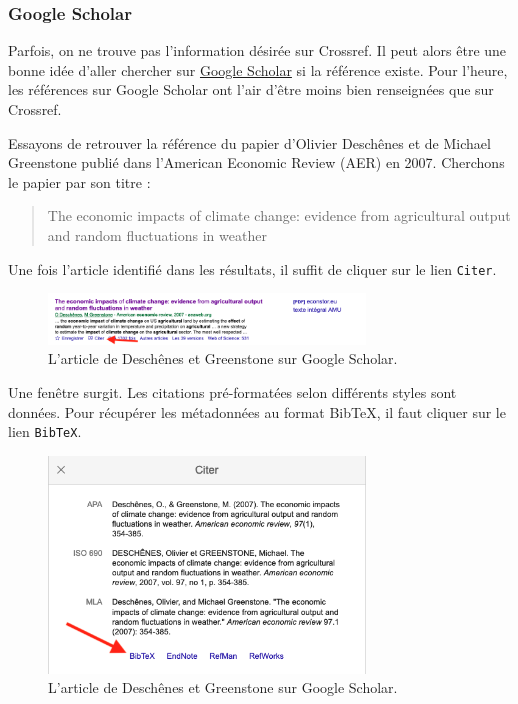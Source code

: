 \documentclass[
  11pt,
]{book}
\numberwithin{equation}{section}
\numberwithin{countremarque}{section}
\begin{document}
\hypertarget{google-scholar}{%
\subsubsection{Google Scholar}\label{google-scholar}}

Parfois, on ne trouve pas l'information désirée sur Crossref. Il peut alors être une bonne idée d'aller chercher sur \href{https://scholar.google.fr/schhp?hl=fr}{Google Scholar} si la référence existe. Pour l'heure, les références sur Google Scholar ont l'air d'être moins bien renseignées que sur Crossref.

Essayons de retrouver la référence du papier d'Olivier Deschênes et de Michael Greenstone publié dans l'American Economic Review (AER) en 2007. Cherchons le papier par son titre :

\begin{quote}
The economic impacts of climate change: evidence from agricultural output and random fluctuations in weather
\end{quote}

Une fois l'article identifié dans les résultats, il suffit de cliquer sur le lien \texttt{Citer}.

\begin{figure}
\centering
\includegraphics[width=0.75\textwidth,height=\textheight]{figs/google_scholar_1.png}
\caption{L'article de Deschênes et Greenstone sur Google Scholar.}
\end{figure}

Une fenêtre surgit. Les citations pré-formatées selon différents styles sont données. Pour récupérer les métadonnées au format BibTeX, il faut cliquer sur le lien \texttt{BibTeX}.

\begin{figure}
\centering
\includegraphics[width=0.75\textwidth,height=\textheight]{figs/google_scholar_2.png}
\caption{L'article de Deschênes et Greenstone sur Google Scholar.}
\end{figure}
\end{document}
